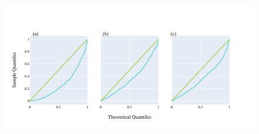 \begin{figure}[!ht]
\centering
\includegraphics[width=\textwidth]{figures/plots/synthetic/lrt/197113_332182_17210.pdf}
\caption{}
\label{fig:synthetic/lrt/197113}
\end{figure}